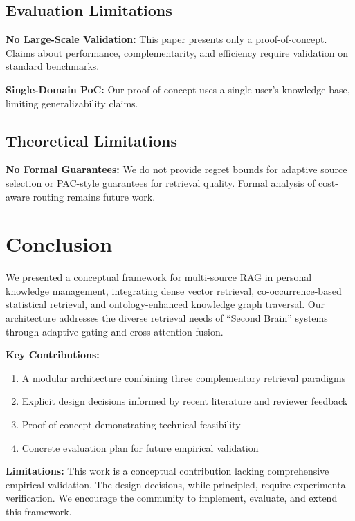 \documentclass[11pt,a4paper]{article}
\begin{document}
\subsection{Evaluation Limitations}

\textbf{No Large-Scale Validation:} This paper presents only a proof-of-concept. Claims about performance, complementarity, and efficiency require validation on standard benchmarks.

\textbf{Single-Domain PoC:} Our proof-of-concept uses a single user's knowledge base, limiting generalizability claims.

\subsection{Theoretical Limitations}

\textbf{No Formal Guarantees:} We do not provide regret bounds for adaptive source selection or PAC-style guarantees for retrieval quality. Formal analysis of cost-aware routing remains future work.

\section{Conclusion}
\label{sec:conclusion}

We presented a conceptual framework for multi-source RAG in personal knowledge management, integrating dense vector retrieval, co-occurrence-based statistical retrieval, and ontology-enhanced knowledge graph traversal. Our architecture addresses the diverse retrieval needs of ``Second Brain'' systems through adaptive gating and cross-attention fusion.

\textbf{Key Contributions:}
\begin{enumerate}
    \item A modular architecture combining three complementary retrieval paradigms
    \item Explicit design decisions informed by recent literature and reviewer feedback
    \item Proof-of-concept demonstrating technical feasibility
    \item Concrete evaluation plan for future empirical validation
\end{enumerate}

\textbf{Limitations:} This work is a conceptual contribution lacking comprehensive empirical validation. The design decisions, while principled, require experimental verification. We encourage the community to implement, evaluate, and extend this framework.
\end{document}
